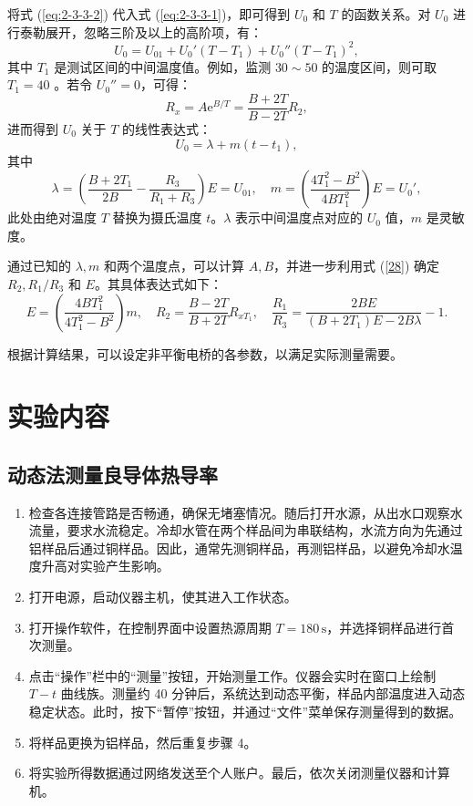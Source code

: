 \documentclass[UTF-8,twoside,cs4size]{ctexart}
\begin{document}
将式 (\ref{eq:2-3-3-2}) 代入式 (\ref{eq:2-3-3-1})，即可得到 $U_0$ 和 $T$ 的函数关系。对 $U_0$ 进行泰勒展开，忽略三阶及以上的高阶项，有：
\[
U_0 = U_{01} + U_0'(T - T_1) + U_0''(T - T_1)^2,
\]
其中 $T_1$ 是测试区间的中间温度值。例如，监测 $30 \sim 50$ \textcelsius 的温度区间，则可取 $T_1 = 40$ \textcelsius。若令 $U_0'' = 0$，可得：
\begin{equation}\label{eq:28}
    R_x = A \mathrm{e}^{B/T} = \frac{B + 2T}{B - 2T}R_2,
\end{equation}
进而得到 $U_0$ 关于 $T$ 的线性表达式：
\[
U_0 = \lambda + m(t - t_1),
\]
其中
\[
\lambda = \left(\frac{B + 2T_1}{2B} - \frac{R_3}{R_1 + R_3}\right)E = U_{01}, \quad 
m = \left(\frac{4T_1^2 - B^2}{4BT_1^2}\right)E = U_0',
\]
此处由绝对温度 $T$ 替换为摄氏温度 $t$。$\lambda$ 表示中间温度点对应的 $U_0$ 值，$m$ 是灵敏度。

通过已知的 $\lambda, m$ 和两个温度点，可以计算 $A, B$，并进一步利用式 (\ref{28}) 确定 $R_2, R_1/R_3$ 和 $E$。其具体表达式如下：
\[
E = \left(\frac{4BT_1^2}{4T_1^2 - B^2}\right)m, \quad 
R_2 = \frac{B - 2T}{B + 2T}R_{xT_1}, \quad 
\frac{R_1}{R_3} = \frac{2BE}{(B + 2T_1)E - 2B\lambda} - 1.
\]

根据计算结果，可以设定非平衡电桥的各参数，以满足实际测量需要。


\section{实验内容}
\subsection{动态法测量良导体热导率}
\begin{enumerate}
    \item 检查各连接管路是否畅通，确保无堵塞情况。随后打开水源，从出水口观察水流量，要求水流稳定。冷却水管在两个样品间为串联结构，水流方向为先通过铝样品后通过铜样品。因此，通常先测铜样品，再测铝样品，以避免冷却水温度升高对实验产生影响。
    
    \item 打开电源，启动仪器主机，使其进入工作状态。
    
    \item 打开操作软件，在控制界面中设置热源周期 $T = 180 \, \mathrm{s}$，并选择铜样品进行首次测量。
    
    \item 点击“操作”栏中的“测量”按钮，开始测量工作。仪器会实时在窗口上绘制 $T-t$ 曲线族。测量约 40 分钟后，系统达到动态平衡，样品内部温度进入动态稳定状态。此时，按下“暂停”按钮，并通过“文件”菜单保存测量得到的数据。
    
    \item 将样品更换为铝样品，然后重复步骤 4。
    
    \item 将实验所得数据通过网络发送至个人账户。最后，依次关闭测量仪器和计算机。
\end{enumerate}
\end{document}

